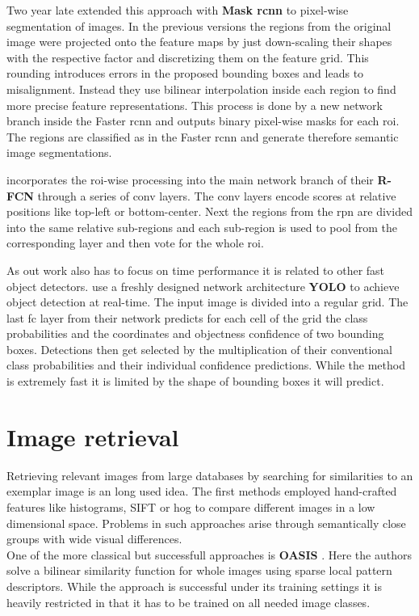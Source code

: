 Two year late \citet{he_mask_2017} extended this approach with \textbf{Mask \gls{rcnn}} to pixel-wise segmentation of images. In the previous versions the regions from the original image were projected onto the feature maps by just down-scaling their shapes with the respective factor and discretizing them on the feature grid. This rounding introduces errors in the proposed bounding boxes and leads to misalignment. Instead they use bilinear interpolation inside each region to find more precise feature representations. This process is done by a new network branch inside the Faster \gls{rcnn} and outputs binary pixel-wise masks for each \gls{roi}. The regions are classified as in the Faster \gls{rcnn} and generate therefore semantic image segmentations.

\citet{dai_r-fcn:_2016} incorporates the \gls{roi}-wise processing into the main network branch of their \textbf{R-FCN} through a series of \gls{conv} layers. The \gls{conv} layers encode scores at relative positions like top-left or bottom-center. Next the regions from the \gls{rpn} are divided into the same relative sub-regions and each sub-region is used to pool from the corresponding layer and then vote for the whole \gls{roi}.

As out work also has to focus on time performance it is related to other fast object detectors. \citet{redmon_you_2016} use a freshly designed network architecture \textbf{YOLO} to achieve object detection at real-time. The input image is divided into a regular grid. The last \gls{fc} layer from their network predicts for each cell of the grid the class probabilities and the coordinates and objectness confidence of two bounding boxes. Detections then get selected by the multiplication of their conventional class probabilities and their individual confidence predictions. While the method is extremely fast it is limited by the shape of bounding boxes it will predict.

\section{Image retrieval}
\label{sec:related:retrieval}
Retrieving relevant images from large databases by searching for similarities to an exemplar image is an long used idea. The first methods employed hand-crafted features like histograms, SIFT or \gls{hog} to compare different images in a low dimensional space. Problems in such approaches arise through semantically close groups with wide visual differences.\\
One of the more classical but successfull approaches is \textbf{OASIS} \citep{chechik_large_2010}. Here the authors solve a bilinear similarity function for whole images using sparse local pattern descriptors. While the approach is successful under its training settings it is heavily restricted in that it has to be trained on all needed image classes.

